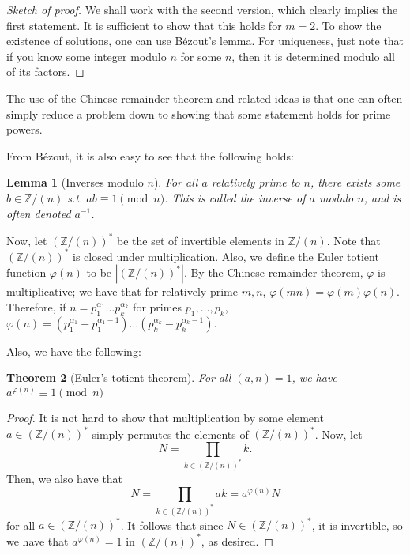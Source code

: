 \documentclass{article}
\theoremstyle{plain}
\newtheorem{theorem}{Theorem}
\newtheorem{lemma}[theorem]{Lemma}
\numberwithin{equation}{section}
\begin{document}
\begin{proof}[Sketch of proof]
We shall work with the second version, which clearly implies the first statement. It is sufficient to show that this holds for 
$m = 2$. To show the existence of solutions, one can use B\'ezout's lemma. For uniqueness, just note that if you know some integer 
modulo $n$ for some $n$, then it is determined modulo all of its factors.
\end{proof}

The use of the Chinese remainder theorem and related ideas is that one can often simply reduce a problem down to showing that 
some statement holds for prime powers.


From B\'ezout, it is also easy to see that the following holds:
\begin{lemma}[Inverses modulo $n$]
For all $a$ relatively prime to $n$, there exists some $b\in\mathbb{Z}/(n)$ s.t. $ab\equiv 1\pmod{n}$. This is called the inverse 
of $a$ modulo $n$, and is often denoted $a^{-1}$.
\end{lemma}

Now, let $(\mathbb{Z}/(n))^*$ be the set of invertible elements in $\mathbb{Z}/(n)$. Note that $(\mathbb{Z}/(n))^*$ is closed under
multiplication. Also, we define the Euler totient function 
$\varphi(n)$ to be $|(\mathbb{Z}/(n))^*|$. By the Chinese remainder theorem, $\varphi$ is multiplicative; we have that for 
relatively prime $m, n$, $\varphi(mn) = \varphi(m)\varphi(n).$ Therefore, if $n = p_1^{\alpha_1}\dots p_k^{\alpha_k}$ for primes 
$p_1,\dots, p_k$, $\varphi(n) = (p_1^{\alpha_1} - p_1^{\alpha_1 - 1})\dots (p_k^{\alpha_k} - p_k^{\alpha_k - 1}).$

Also, we have the following:

\begin{theorem}[Euler's totient theorem]
For all $(a, n) = 1$, we have $a^{\varphi(n)} \equiv 1\pmod{n}$
\end{theorem}

\begin{proof} 
It is not hard to show that multiplication by some element $a\in(\mathbb{Z}/(n))^*$ simply permutes the elements of 
$(\mathbb{Z}/(n))^*$. Now, let $$N = \prod_{k\in(\mathbb{Z}/(n))^*} k.$$ Then, we also have that 
$$N = \prod_{k\in(\mathbb{Z}/(n))^*} ak = a^{\varphi(n)}N$$ for all $a \in (\mathbb{Z}/(n))^*$. It follows that since 
$N\in(\mathbb{Z}/(n))^*$, it is invertible, so we have that $a^{\varphi(n)} = 1$ in $(\mathbb{Z}/(n))^*$, as desired.
\end{proof}
\end{document}
